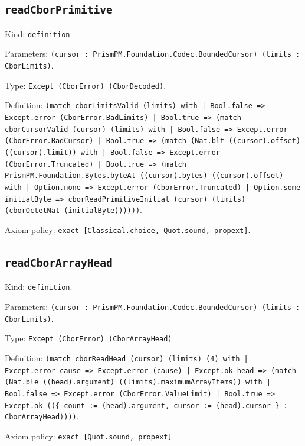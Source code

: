 \documentclass[11pt]{article}
\begin{document}
\subsection*{\texttt{readCborPrimitive}}
\noindent Kind: \texttt{definition}.\par
\noindent Parameters: \texttt{(cursor : PrismPM.Foundation.Codec.BoundedCursor) (limits : CborLimits)}.\par
\noindent Type: \texttt{Except (CborError) (CborDecoded)}.\par
\noindent Definition: \texttt{(match cborLimitsValid (limits) with | Bool.false => Except.error (CborError.BadLimits) | Bool.true => (match cborCursorValid (cursor) (limits) with | Bool.false => Except.error (CborError.BadCursor) | Bool.true => (match (Nat.blt ((cursor).offset) ((cursor).limit)) with | Bool.false => Except.error (CborError.Truncated) | Bool.true => (match PrismPM.Foundation.Bytes.byteAt ((cursor).bytes) ((cursor).offset) with | Option.none => Except.error (CborError.Truncated) | Option.some initialByte => cborReadPrimitiveInitial (cursor) (limits) (cborOctetNat (initialByte))))))}.\par
\noindent Axiom policy: \texttt{exact [Classical.choice, Quot.sound, propext]}.\par
\subsection*{\texttt{readCborArrayHead}}
\noindent Kind: \texttt{definition}.\par
\noindent Parameters: \texttt{(cursor : PrismPM.Foundation.Codec.BoundedCursor) (limits : CborLimits)}.\par
\noindent Type: \texttt{Except (CborError) (CborArrayHead)}.\par
\noindent Definition: \texttt{(match cborReadHead (cursor) (limits) (4) with | Except.error cause => Except.error (cause) | Except.ok head => (match (Nat.ble ((head).argument) ((limits).maximumArrayItems)) with | Bool.false => Except.error (CborError.ValueLimit) | Bool.true => Except.ok ((\{ count := (head).argument, cursor := (head).cursor \} : CborArrayHead))))}.\par
\noindent Axiom policy: \texttt{exact [Quot.sound, propext]}.\par
\end{document}
